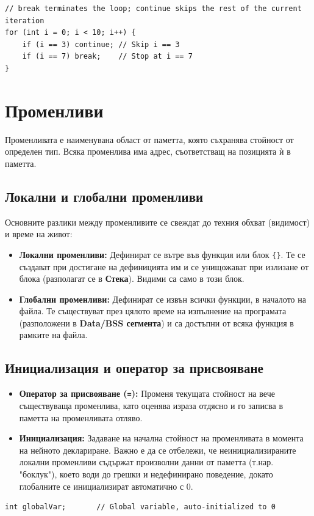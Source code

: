 \documentclass{scrartcl}
\begin{document}
\begin{FlushLeft}
\begin{lstlisting}
// break terminates the loop; continue skips the rest of the current iteration
for (int i = 0; i < 10; i++) {
    if (i == 3) continue; // Skip i == 3
    if (i == 7) break;    // Stop at i == 7
}
\end{lstlisting}

\section{Променливи}
Променливата е наименувана област от паметта, която съхранява стойност от определен тип. Всяка променлива има адрес, съответстващ на позицията ѝ в паметта.

\subsection{Локални и глобални променливи}
Основните разлики между променливите се свеждат до техния обхват (видимост) и време на живот:
\begin{itemize}
    \item \textbf{Локални променливи:} Дефинират се вътре във функция или блок \texttt{\{\}}. Те се създават при достигане на дефиницията им и се унищожават при излизане от блока (разполагат се в \textbf{Стека}). Видими са само в този блок.
    \item \textbf{Глобални променливи:} Дефинират се извън всички функции, в началото на файла. Те съществуват през цялото време на изпълнение на програмата (разположени в \textbf{Data/BSS сегмента}) и са достъпни от всяка функция в рамките на файла.
\end{itemize}

\subsection{Инициализация и оператор за присвояване}
\begin{itemize}
    \item \textbf{Оператор за присвояване (\texttt{=}):} Променя текущата стойност на вече съществуваща променлива, като оценява израза отдясно и го записва в паметта на променливата отляво.
    \item \textbf{Инициализация:} Задаване на начална стойност на променливата в момента на нейното деклариране. Важно е да се отбележи, че неинициализираните локални променливи съдържат произволни данни от паметта (т.нар. "боклук"), което води до грешки и недефинирано поведение, докато глобалните се инициализират автоматично с 0.
\end{itemize}
\begin{lstlisting}
int globalVar;       // Global variable, auto-initialized to 0


\end{lstlisting}
\end{FlushLeft}
\end{document}
